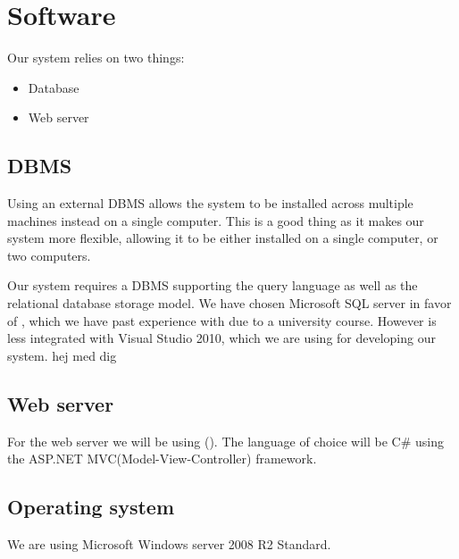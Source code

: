 \section{Software}
\label{sec:software}

Our system relies on two things:

\begin{itemize}
	\item Database
	\item Web server
\end{itemize}

\subsection{DBMS}
\label{subsec:dbms}

Using an external DBMS allows the system to be installed across multiple machines instead on a single computer. This is a good thing as it makes our system more flexible, allowing it to be either installed on a single computer, or two computers.

Our system requires a DBMS supporting the query language \sql[] as well as the relational database storage model.
We have chosen Microsoft SQL server in favor of \posgresql[], which we have past experience with due to a university course. However \posgresql[] is less integrated with Visual Studio 2010, which we are using for developing our system. hej med dig

\subsection{Web server}
\label{subsec:webserver}

For the web server we will be using  \wholeiis[] (\iis[]). 
The language of choice will be C\# using the ASP.NET MVC(Model-View-Controller) framework. \\


\subsection{Operating system}
\label{subsec:operating_system}

We are using Microsoft Windows server 2008 R2 Standard. 